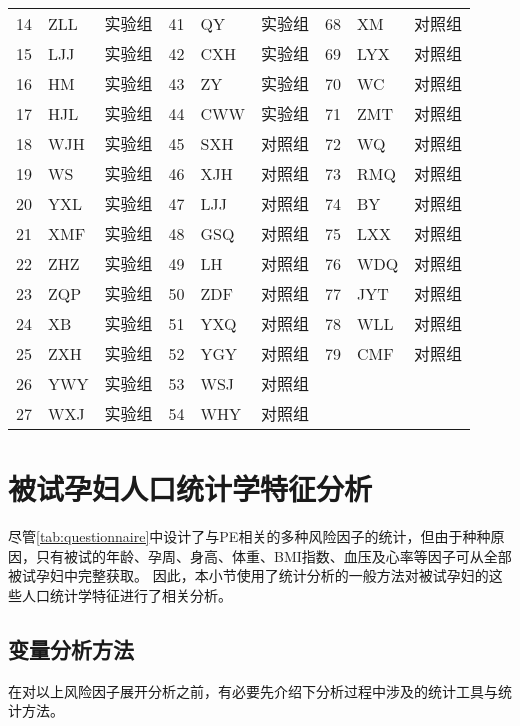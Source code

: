 \begin{table}[htbp]
\begin{tabularx}{\linewidth}{X<{\centering}X<{\centering}X<{\centering}X<{\centering}X<{\centering}X<{\centering}X<{\centering}X<{\centering}X<{\centering}}
      14    & ZLL   & 实验组   & 41    & QY    & 实验组   & 68    & XM    & 对照组 \\
      15    & LJJ   & 实验组   & 42    & CXH   & 实验组   & 69    & LYX   & 对照组 \\
      16    & HM    & 实验组   & 43    & ZY    & 实验组   & 70    & WC    & 对照组 \\
      17    & HJL   & 实验组   & 44    & CWW   & 实验组   & 71    & ZMT   & 对照组 \\
      18    & WJH   & 实验组   & 45    & SXH   & 对照组   & 72    & WQ    & 对照组 \\
      19    & WS    & 实验组   & 46    & XJH   & 对照组   & 73    & RMQ   & 对照组 \\
      20    & YXL   & 实验组   & 47    & LJJ   & 对照组   & 74    & BY    & 对照组 \\
      21    & XMF   & 实验组   & 48    & GSQ   & 对照组   & 75    & LXX   & 对照组 \\
      22    & ZHZ   & 实验组   & 49    & LH    & 对照组   & 76    & WDQ   & 对照组 \\
      23    & ZQP   & 实验组   & 50    & ZDF   & 对照组   & 77    & JYT   & 对照组 \\
      24    & XB    & 实验组   & 51    & YXQ   & 对照组   & 78    & WLL   & 对照组 \\
      25    & ZXH   & 实验组   & 52    & YGY   & 对照组   & 79    & CMF   & 对照组 \\
      26    & YWY   & 实验组   & 53    & WSJ   & 对照组   &       &       &  \\
      27    & WXJ   & 实验组   & 54    & WHY   & 对照组   &       &       &  \\
      \bottomrule
      \end{tabularx}%
\end{table}%

\section{被试孕妇人口统计学特征分析}
尽管\autoref{tab:questionnaire}中设计了与PE相关的多种风险因子的统计，但由于种种原因，只有被试的年龄、孕周、身高、体重、BMI指数、血压及心率等因子可从全部被试孕妇中完整获取。
因此，本小节使用了统计分析的一般方法对被试孕妇的这些人口统计学特征进行了相关分析。
\subsection{变量分析方法}
在对以上风险因子展开分析之前，有必要先介绍下分析过程中涉及的统计工具与统计方法。

